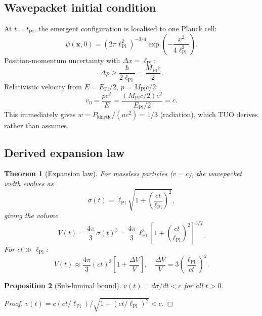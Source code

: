 \documentclass[12pt,a4paper]{article}
\newtheorem{theorem}{Theorem}[section]
\newtheorem{proposition}[theorem]{Proposition}
\theoremstyle{definition}
\theoremstyle{remark}
\newcommand{\EPl}{E_{\mathrm{Pl}}}
\newcommand{\tPl}{t_{\mathrm{Pl}}}
\newcommand{\lPl}{\ell_{\mathrm{Pl}}}
\newcommand{\MPl}{M_{\mathrm{Pl}}}
\begin{document}
\subsection{Wavepacket initial condition}

At $t = \tPl$, the emergent configuration is localised to one Planck cell:
\begin{equation}\label{eq:psi0}
  \psi(\mathbf{x},0)
  = (2\pi\lPl^2)^{-3/4}\exp\!\left(-\frac{x^2}{4\lPl^2}\right).
\end{equation}
Position-momentum uncertainty with $\Delta x = \lPl$:
\begin{equation}
  \Delta p \geq \frac{\hbar}{2\lPl} = \frac{\MPl c}{2}.
\end{equation}
Relativistic velocity from $E = \EPl/2$, $p = \MPl c/2$:
\begin{equation}\label{eq:v_c}
  v_0 = \frac{pc^2}{E} = \frac{(\MPl c/2)c^2}{\EPl/2} = c.
\end{equation}
This immediately gives $w = P_\mathrm{kinetic}/(uc^2) = 1/3$ (radiation),
which TUO derives rather than assumes.

\subsection{Derived expansion law}

\begin{theorem}[Expansion law]\label{thm:expansion}
For massless particles ($v = c$), the wavepacket width evolves as
\begin{equation}\label{eq:sigma}
  \sigma(t) = \lPl\sqrt{1 + \left(\frac{ct}{\lPl}\right)^2},
\end{equation}
giving the volume
\begin{equation}\label{eq:V_t}
  V(t) = \frac{4\pi}{3}\,\sigma(t)^3
  = \frac{4\pi}{3}\,\lPl^3\!\left[1 + \left(\frac{ct}{\lPl}\right)^2\right]^{3/2}.
\end{equation}
For $ct \gg \lPl$:
\begin{equation}\label{eq:V_classical}
  V(t) \approx \frac{4\pi}{3}(ct)^3
  \left[1 + \frac{\Delta V}{V}\right],
  \quad
  \frac{\Delta V}{V} = 3\!\left(\frac{\lPl}{ct}\right)^2.
\end{equation}
\end{theorem}

\begin{proposition}[Sub-luminal bound]\label{prop:sub}
$v(t) = d\sigma/dt < c$ for all $t > 0$.
\end{proposition}
\begin{proof}
$v(t) = c(ct/\lPl)/\sqrt{1+(ct/\lPl)^2} < c$.
\end{proof}
\end{document}
